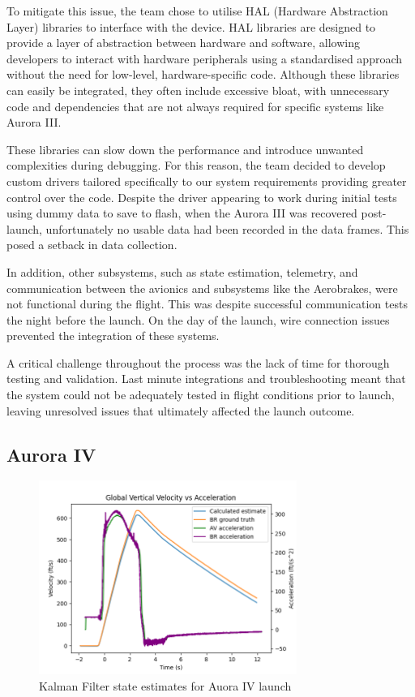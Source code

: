 To mitigate this issue, the team chose to utilise HAL (Hardware Abstraction Layer) libraries to interface with the device. HAL libraries are designed to provide a layer of abstraction between hardware and software, allowing developers to interact with hardware peripherals using a standardised approach without the need for low-level, hardware-specific code. Although these libraries can easily be integrated, they often include excessive bloat, with unnecessary code and dependencies that are not always required for specific systems like Aurora III. 

These libraries can slow down the performance and introduce unwanted complexities during debugging. For this reason, the team decided to develop custom drivers tailored specifically to our system requirements providing greater control over the code. Despite the driver appearing to work during initial tests using dummy data to save to flash, when the Aurora III was recovered post-launch, unfortunately no usable data had been recorded in the data frames. This posed a setback in data collection. 

In addition, other subsystems, such as state estimation, telemetry, and communication between the avionics and subsystems like the Aerobrakes, were not functional during the flight. This was despite successful communication tests the night before the launch. On the day of the launch, wire connection issues prevented the integration of these systems.  

A critical challenge throughout the process was the lack of time for thorough testing and validation. Last minute integrations and troubleshooting meant that the system could not be adequately tested in flight conditions prior to launch, leaving unresolved issues that ultimately affected the launch outcome.

\subsection{Aurora IV}
\begin{figure}[h]
    \begin{center}
        \includegraphics[width=0.75\textwidth]{./img/velocity_A4.png}
    \end{center}
    \caption{Kalman Filter state estimates for Auora IV launch}\label{fig:velocity_A4}
\end{figure}

